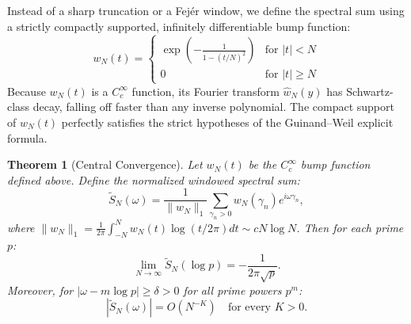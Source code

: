 \documentclass{pre-aomart}
\theoremstyle{plain}
\newtheorem{theorem}{Theorem}[section]
\theoremstyle{definition}
\theoremstyle{remark}
\begin{document}
Instead of a sharp truncation or a Fej\'er window, we define the spectral sum using a strictly compactly supported, infinitely differentiable bump function:
\[
w_N(t) = \begin{cases}
\exp\left(-\frac{1}{1 - (t/N)^2}\right) & \text{for } |t| < N \\
0 & \text{for } |t| \ge N
\end{cases}
\]
Because $w_N(t)$ is a $C^\infty_c$ function, its Fourier transform $\widehat{w}_N(y)$ has Schwartz-class decay, falling off faster than any inverse polynomial. The compact support of $w_N(t)$ perfectly satisfies the strict hypotheses of the Guinand--Weil explicit formula.

\begin{theorem}[Central Convergence]\label{thm:central_conv}
Let $w_N(t)$ be the $C_c^\infty$ bump function defined above. Define the normalized windowed spectral sum:
\[
\widetilde{S}_N(\omega) = \frac{1}{\|w_N\|_1} \sum_{\gamma_n > 0} w_N(\gamma_n) e^{i\omega \gamma_n},
\]
where $\|w_N\|_1 = \frac{1}{2\pi} \int_{-N}^{N} w_N(t) \log(t/2\pi) dt \sim c N \log N$.
Then for each prime $p$:
\[
\lim_{N \to \infty} \widetilde{S}_N(\log p) = -\frac{1}{2\pi\sqrt{p}}.
\]
Moreover, for $|\omega - m\log p| \ge \delta > 0$ for all prime powers $p^m$:
\[
|\widetilde{S}_N(\omega)| = O(N^{-K}) \quad \text{for every } K > 0.
\]
\end{theorem}
\end{document}
